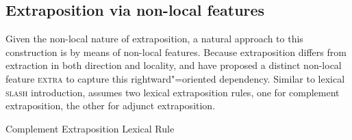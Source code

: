 \documentclass[output=paper
,notxmath 
 	        ,biblatex
                ,babelshorthands
                ,newtxmath
                ,draftmode
                ,colorlinks, citecolor=brown
]{langscibook}
\begin{document}
\subsection{Extraposition via non-local features}

Given the non-local nature of extraposition, a natural approach to
this construction is by means of non-local features. Because
extraposition differs from extraction in both direction and locality,
\citet{Keller:95} and \citet[Section~13.2]{Mueller99a}
have proposed a distinct non-local feature \textsc{extra} to capture
this rightward"=oriented dependency. 
Similar to lexical \textsc{slash} introduction, \citet[]{Keller:95} assumes two lexical
extraposition rules, one for  complement extraposition, the other for
adjunct extraposition. 



\ea
Complement Extraposition Lexical Rule\\
\end{document}
